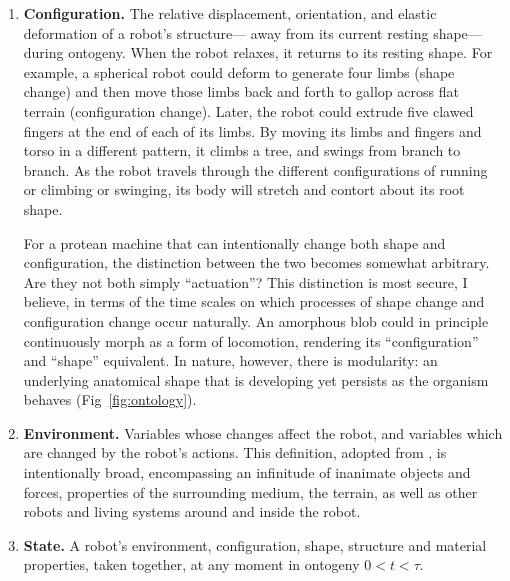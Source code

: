 \begin{enumerate}
    \item \textbf{Configuration.}
    The relative displacement, orientation, and elastic deformation of a robot's structure---%
    away from its current resting shape---%
    during ontogeny.
    When the robot relaxes, it returns to its resting shape.
    For example, a spherical robot could deform to generate four limbs (shape change) and then move those limbs back and forth to gallop across flat terrain (configuration change).
    Later, the robot could extrude five clawed fingers at the end of each of its limbs.
    By moving its limbs and fingers and torso in a different pattern, it climbs a tree, and swings from branch to branch.
    As the robot travels through the different configurations of running or climbing or swinging, its body will stretch and contort about its root shape.
    
    
    For a protean machine that can intentionally change both shape and configuration, the distinction between the two becomes somewhat arbitrary.
    Are they not both simply ``actuation''?
    This distinction is most secure, I believe, in terms of the time scales on which processes of shape change 
    and configuration change 
    occur naturally.
    An amorphous blob could in principle continuously morph as a form of locomotion, rendering its ``configuration'' and ``shape'' equivalent.
    In nature, however, there is modularity: an underlying anatomical shape that is developing yet persists as the organism behaves (Fig~\ref{fig:ontology}).
    
    
    
    \item \textbf{Environment.}
    Variables whose changes affect the robot, 
    and variables which are changed by the robot's actions.
    This definition, adopted from \citet{ashby1952design}, is intentionally broad, encompassing an infinitude of inanimate objects and forces, 
    properties of the surrounding medium,
    the terrain,
    as well as other robots and living systems around and inside the robot.
    
    \item \textbf{State.}
    A robot's environment, configuration, shape, structure and material properties, taken together, at any moment in ontogeny $0<t<\tau$.
    

\end{enumerate}
